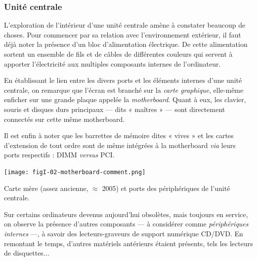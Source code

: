 \subsubsection[Unité centrale]{Unité centrale}
\label{subsub:I.1.1.2}

L'exploration de l'intérieur d'une unité centrale amène à constater beaucoup de choses. Pour commencer par sa relation avec l'environnement extérieur, il faut déjà noter la présence d'un bloc d'alimentation électrique. De cette alimentation sortent un ensemble de fils et de câbles de différentes couleurs qui servent à apporter l'électricité aux multiples composants internes de l'ordinateur.  

En établissant le lien entre les divers ports et les éléments internes d'une unité centrale, on remarque que l'écran est branché sur la \emph{carte graphique}, elle-même enficher sur une grande plaque appelée la \emph{\gls{motherboard}}. Quant à eux, les clavier, souris et disques durs principaux --- dits « maîtres » --- sont directement connectés sur cette même \gls{motherboard}.

Il est enfin à noter que les barrettes de mémoire dites « vives » et les cartes d'extension de tout ordre sont de même intégrées à la \gls{motherboard} \textit{via} leurs ports respectifs : DIMM \textit{versus} PCI.

\begin{fullwidth}
  \vspace*{-0.25\baselineskip}
  \texttt{[image: figI-02-motherboard-comment.png]}
  \captionsetup{type=figure}
  \vspace*{-\baselineskip}
  \caption{\label{fig:I.2}Carte mère (assez ancienne, $\approx$ 2005) et ports des périphériques de l'unité centrale.}
\end{fullwidth}

Sur certains ordinateurs devenus aujourd'hui obsolètes, mais toujours en service, on observe la présence d'autres composants --- à considérer comme \emph{périphériques internes} ---, à savoir des lecteurs-graveurs de support numérique CD/DVD. En remontant le temps, d'autres matériels antérieurs étaient présents, tels les lecteurs de disquettes...

